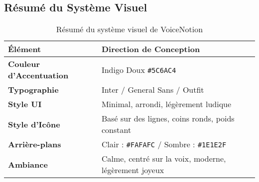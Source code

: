 \subsection{Résumé du Système Visuel}

\begin{table}[H]
    \centering
    \begin{tabular}{|p{4cm}|p{9cm}|}
        \hline
        \textbf{Élément} & \textbf{Direction de Conception} \\
        \hline
        \textbf{Couleur d'Accentuation} & Indigo Doux \texttt{\#5C6AC4} \\
        \hline
        \textbf{Typographie} & Inter / General Sans / Outfit \\
        \hline
        \textbf{Style UI} & Minimal, arrondi, légèrement ludique \\
        \hline
        \textbf{Style d'Icône} & Basé sur des lignes, coins ronds, poids constant \\
        \hline
        \textbf{Arrière-plans} & Clair : \texttt{\#FAFAFC} / Sombre : \texttt{\#1E1E2F} \\
        \hline
        \textbf{Ambiance} & Calme, centré sur la voix, moderne, légèrement joyeux \\
        \hline
    \end{tabular}
    \caption{Résumé du système visuel de VoiceNotion}
    \label{tab:visual_system_summary}
\end{table}
